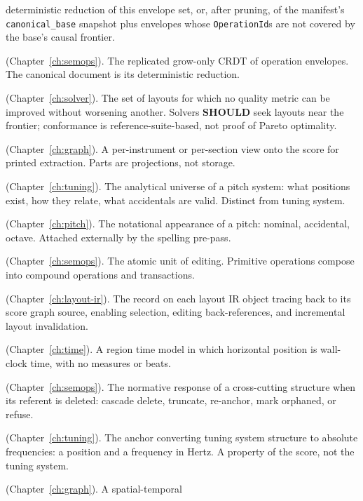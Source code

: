 \documentclass[11pt,letterpaper]{report}
\newcommand{\SHOULD}{\textbf{SHOULD}}
\begin{document}
\begin{description}
    deterministic reduction of this envelope set, or, after
    pruning, of the manifest's \texttt{canonical\_base}
    snapshot plus envelopes whose \texttt{OperationId}s are not
    covered by the base's causal frontier.
  \item[Operation set] (Chapter~\ref{ch:semops}). The replicated
    grow-only CRDT of operation envelopes. The canonical
    document is its deterministic reduction.
  \item[Pareto frontier (design target)]
    (Chapter~\ref{ch:solver}). The set of layouts for which no
    quality metric can be improved without worsening another.
    Solvers \SHOULD{} seek layouts near the frontier; conformance
    is reference-suite-based, not proof of Pareto optimality.
  \item[Part] (Chapter~\ref{ch:graph}). A per-instrument or
    per-section view onto the score for printed extraction. Parts
    are projections, not storage.
  \item[Pitch space] (Chapter~\ref{ch:tuning}). The analytical
    universe of a pitch system: what positions exist, how they
    relate, what accidentals are valid. Distinct from tuning system.
  \item[Pitch spelling] (Chapter~\ref{ch:pitch}). The notational
    appearance of a pitch: nominal, accidental, octave. Attached
    externally by the spelling pre-pass.
  \item[Primitive operation] (Chapter~\ref{ch:semops}). The atomic
    unit of editing. Primitive operations compose into compound
    operations and transactions.
  \item[Provenance] (Chapter~\ref{ch:layout-ir}). The record on
    each layout IR object tracing back to its score graph source,
    enabling selection, editing back-references, and incremental
    layout invalidation.
  \item[Proportional time] (Chapter~\ref{ch:time}). A region time
    model in which horizontal position is wall-clock time, with no
    measures or beats.
  \item[Re-anchoring] (Chapter~\ref{ch:semops}). The normative
    response of a cross-cutting structure when its referent is
    deleted: cascade delete, truncate, re-anchor, mark orphaned,
    or refuse.
  \item[Reference pitch] (Chapter~\ref{ch:tuning}). The anchor
    converting tuning system structure to absolute frequencies:
    a position and a frequency in Hertz. A property of the score,
    not the tuning system.
  \item[Region] (Chapter~\ref{ch:graph}). A spatial-temporal

\end{description}
\end{document}
